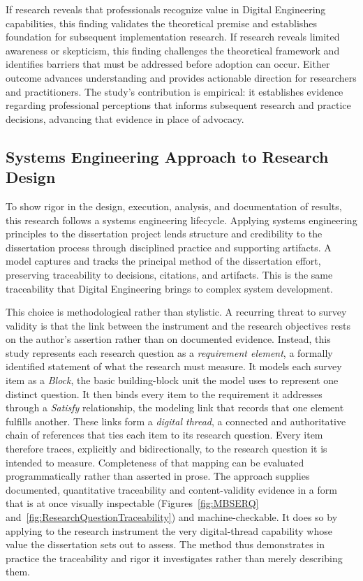 If research reveals that professionals recognize value in Digital Engineering capabilities, this finding validates the theoretical premise and establishes foundation for subsequent implementation research. If research reveals limited awareness or skepticism, this finding challenges the theoretical framework and identifies barriers that must be addressed before adoption can occur. Either outcome advances understanding and provides actionable direction for researchers and practitioners. The study's contribution is empirical: it establishes evidence regarding professional perceptions that informs subsequent research and practice decisions, advancing that evidence in place of advocacy.

\subsection{Systems Engineering Approach to Research Design}

To show rigor in the design, execution, analysis, and documentation of results, this research follows a systems engineering lifecycle. Applying systems engineering principles to the dissertation project lends structure and credibility to the dissertation process through disciplined practice and supporting artifacts. A model captures and tracks the principal method of the dissertation effort, preserving traceability to decisions, citations, and artifacts. This is the same traceability that Digital Engineering brings to complex system development.

This choice is methodological rather than stylistic. A recurring threat to survey validity is that the link between the instrument and the research objectives rests on the author's assertion rather than on documented evidence. Instead, this study represents each research question as a \emph{requirement element}, a formally identified statement of what the research must measure. It models each survey item as a \emph{Block}, the basic building-block unit the model uses to represent one distinct question. It then binds every item to the requirement it addresses through a \emph{Satisfy} relationship, the modeling link that records that one element fulfills another. These links form a \emph{digital thread}, a connected and authoritative chain of references that ties each item to its research question. Every item therefore traces, explicitly and bidirectionally, to the research question it is intended to measure. Completeness of that mapping can be evaluated programmatically rather than asserted in prose. The approach supplies documented, quantitative traceability and content-validity evidence in a form that is at once visually inspectable (Figures~\ref{fig:MBSERQ} and~\ref{fig:ResearchQuestionTraceability}) and machine-checkable. It does so by applying to the research instrument the very digital-thread capability whose value the dissertation sets out to assess. The method thus demonstrates in practice the traceability and rigor it investigates rather than merely describing them.


